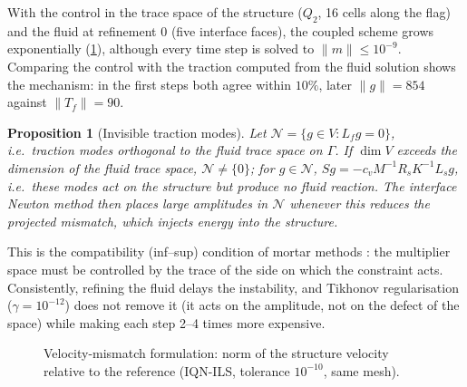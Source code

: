 \documentclass[11pt,a4paper]{article}
\newtheorem{proposition}{Proposition}[section]
\theoremstyle{definition}
\theoremstyle{remark}
\newcommand{\G}{\Gamma}
\newcommand{\M}{M}
\begin{document}
With the control in the trace space of the structure ($Q_2$, 16 cells along the flag) and the fluid
at refinement 0 (five interface faces), the coupled scheme grows exponentially
(\cref{fig:stability}), although every time step is solved to $\|m\|\le10^{-9}$. Comparing the
control with the traction computed from the fluid solution shows the mechanism: in the first steps
both agree within $10\%$, later $\|g\|=854$ against $\|T_f\|=90$.

\begin{proposition}[Invisible traction modes]
Let $\mathcal N=\{g\in V: L_f g = 0\}$, i.e.\ traction modes orthogonal to the fluid trace space on
$\G$. If $\dim V$ exceeds the dimension of the fluid trace space, $\mathcal N\neq\{0\}$; for
$g\in\mathcal N$, $Sg = -c_v\M^{-1}R_sK^{-1}L_sg$, i.e.\ these modes act on the structure but
produce no fluid reaction. The interface Newton method then places large amplitudes in
$\mathcal N$ whenever this reduces the projected mismatch, which injects energy into the structure.
\end{proposition}

This is the compatibility (inf--sup) condition of mortar methods
\cite{Babuska1973,BernardiMadayPatera1994}: the multiplier space must be controlled by the trace of
the side on which the constraint acts. Consistently, refining the fluid delays the instability,
and Tikhonov regularisation ($\gamma=10^{-12}$) does not remove it (it acts on the amplitude, not
on the defect of the space) while making each step 2--4 times more expensive.

\begin{figure}[ht]\centering
{}
\caption{Velocity-mismatch formulation: norm of the structure velocity relative to the reference
(IQN-ILS, tolerance $10^{-10}$, same mesh).}\label{fig:stability}
\end{figure}
\end{document}
